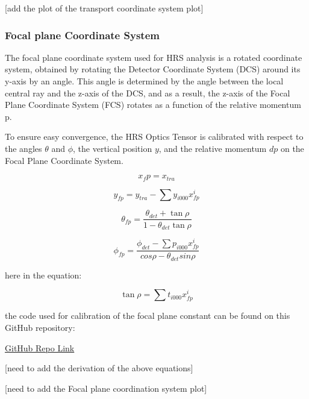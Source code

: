 [add the plot of the transport coordinate system plot]


\subsubsection{Focal plane Coordinate System}

The focal plane coordinate system used for HRS analysis is a rotated coordinate system, obtained by rotating the Detector Coordinate System (DCS) around its y-axis by an angle. This angle is determined by the angle between the local central ray and the z-axis of the DCS, and as a result, the z-axis of the Focal Plane Coordinate System (FCS) rotates as a function of the relative momentum p.

To ensure easy convergence, the HRS Optics Tensor is calibrated with respect to the angles $\theta$ and $\phi$, the vertical position $y$, and the relative momentum $dp$ on the Focal Plane Coordinate System.

\begin{equation}
    x_fp = x_{tra}    \label{eq:cpt3_fps_1}
\end{equation}

\begin{equation}
    y_{fp} = y_{tra} - \sum y_{i000}x^i_{fp}  
\end{equation}

\begin{equation}
\theta_{fp} = \frac{\theta_{det} + \tan\rho}{1 - \theta_{det}\tan\rho}
\end{equation}


\begin{equation}
    \phi_{fp} = \frac{\phi_{det} - \sum p_{i000}x^i_{fp}}{cos \rho - \theta_{det} sin\rho}
\end{equation}

here  in the equation:

\begin{equation}
    \tan\rho  = \sum t_{i000}x^i_{fp}
\end{equation}


the code used for calibration of the focal plane constant can be found on this GitHub repository: 

\hyperlink{https://github.com/Jiansiyu/GeneralScripts/blob/master/vdcConstantOpt}{GitHub Repo Link}

[need to add the derivation of the above equations]

[need to add the Focal plane coordination system plot]

